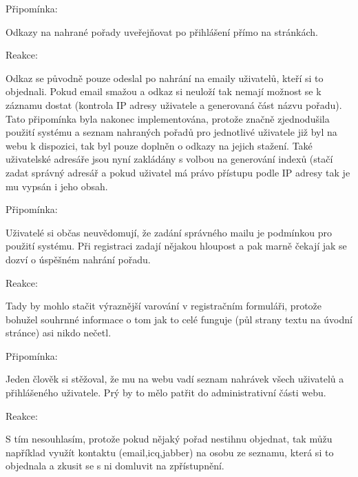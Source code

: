 \vspace{10pt}
 
\begin{bf}Připomínka:\end{bf} Odkazy na nahrané pořady uveřejňovat po přihlášení přímo na stránkách. 

\begin{bf}Reakce:\end{bf} Odkaz se původně pouze odeslal po nahrání na emaily uživatelů, kteří si to objednali. Pokud email smažou a odkaz si neuloží tak nemají možnost se k záznamu dostat (kontrola IP adresy uživatele a generovaná část názvu pořadu). Tato připomínka byla nakonec implementována, protože značně zjednodušila použití systému a seznam nahraných pořadů pro jednotlivé uživatele již byl na webu k dispozici, tak byl pouze doplněn o odkazy na jejich stažení. Také uživatelské adresáře jsou nyní zakládány s volbou na generování indexů (stačí zadat správný adresář a pokud uživatel má právo přístupu podle IP adresy tak je mu vypsán i jeho obsah.

\vspace{10pt}

\begin{bf}Připomínka:\end{bf} Uživatelé si občas neuvědomují, že zadání správného mailu je podmínkou pro použití systému. Při registraci zadají nějakou hloupost a pak marně čekají jak se dozví o úspěšném nahrání pořadu.

\begin{bf}Reakce:\end{bf} Tady by mohlo stačit výraznější varování v registračním formuláři, protože bohužel souhrnné informace o tom jak to celé funguje (půl strany textu na úvodní stránce) asi nikdo nečetl.

\vspace{10pt}

\begin{bf}Připomínka:\end{bf} Jeden člověk si stěžoval, že mu na webu vadí seznam nahrávek všech uživatelů a přihlášeného uživatele. Prý by to mělo patřit do administrativní části webu.

\begin{bf}Reakce:\end{bf} S tím nesouhlasím, protože pokud nějaký pořad nestihnu objednat, tak můžu například využít kontaktu (email,icq,jabber) na osobu ze seznamu, která si to objednala a zkusit se s ni domluvit na zpřístupnění.

